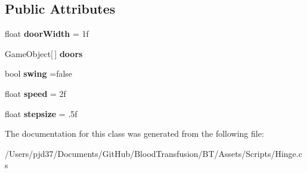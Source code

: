 \subsection*{Public Attributes}
\begin{DoxyCompactItemize}
\item 
float {\bfseries door\+Width} = 1f\hypertarget{class_hinge_acc767a37150389d6c49082807d0c1e7d}{}\label{class_hinge_acc767a37150389d6c49082807d0c1e7d}

\item 
Game\+Object\mbox{[}$\,$\mbox{]} {\bfseries doors}\hypertarget{class_hinge_a4660a1ddc4c88b672be8507a123c0a87}{}\label{class_hinge_a4660a1ddc4c88b672be8507a123c0a87}

\item 
bool {\bfseries swing} =false\hypertarget{class_hinge_aad877def252a16ef41e69b12f6a93072}{}\label{class_hinge_aad877def252a16ef41e69b12f6a93072}

\item 
float {\bfseries speed} = 2f\hypertarget{class_hinge_a76bf848a836b0e3ae9de1a58947434cd}{}\label{class_hinge_a76bf848a836b0e3ae9de1a58947434cd}

\item 
float {\bfseries stepsize} = .\+5f\hypertarget{class_hinge_aa1fec9879c336c206352aca420944a9b}{}\label{class_hinge_aa1fec9879c336c206352aca420944a9b}

\end{DoxyCompactItemize}


The documentation for this class was generated from the following file\+:\begin{DoxyCompactItemize}
\item 
/\+Users/pjd37/\+Documents/\+Git\+Hub/\+Blood\+Transfusion/\+B\+T/\+Assets/\+Scripts/Hinge.\+cs\end{DoxyCompactItemize}
